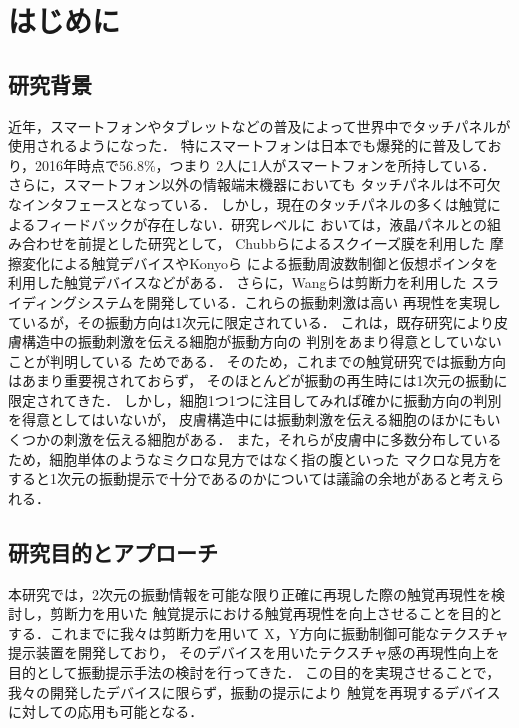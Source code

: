 
\chapter{はじめに}
\section{研究背景}
近年，スマートフォンやタブレットなどの普及によって世界中でタッチパネルが使用されるようになった．
特にスマートフォンは日本でも爆発的に普及しており，2016年時点で56.8\%，つまり
2人に1人がスマートフォンを所持している\cite{soumu}．
さらに，スマートフォン以外の情報端末機器においても
タッチパネルは不可欠なインタフェースとなっている．
しかし，現在のタッチパネルの多くは触覚によるフィードバックが存在しない．研究レベルに
おいては，液晶パネルとの組み合わせを前提とした研究として，
Chubbら\cite{chubb2010shiverpad}によるスクイーズ膜を利用した
摩擦変化による触覚デバイスやKonyoら\cite{konyo2008alternative}
による振動周波数制御と仮想ポインタを利用した触覚デバイスなどがある．
さらに，Wangら\cite{wang2004haptic}は剪断力を利用した
スライディングシステムを開発している．これらの振動刺激は高い
再現性を実現しているが，その振動方向は1次元に限定されている．
これは，既存研究により皮膚構造中の振動刺激を伝える細胞が振動方向の
判別をあまり得意としていないことが判明している
\cite{brisben1999detection}ためである．
そのため，これまでの触覚研究では振動方向はあまり重要視されておらず，
そのほとんどが振動の再生時には1次元の振動に限定されてきた．
しかし，細胞1つ1つに注目してみれば確かに振動方向の判別を得意としてはいないが，
皮膚構造中には振動刺激を伝える細胞のほかにもいくつかの刺激を伝える細胞がある．
また，それらが皮膚中に多数分布しているため，細胞単体のようなミクロな見方ではなく指の腹といった
マクロな見方をすると1次元の振動提示で十分であるのかについては議論の余地があると考えられる．

\section{研究目的とアプローチ}
本研究では，2次元の振動情報を可能な限り正確に再現した際の触覚再現性を検討し，剪断力を用いた
触覚提示における触覚再現性を向上させることを目的とする．これまでに我々は剪断力を用いて
X，Y方向に振動制御可能なテクスチャ提示装置を開発しており，
そのデバイスを用いたテクスチャ感の再現性向上を目的として振動提示手法の検討を行ってきた．
この目的を実現させることで，我々の開発したデバイスに限らず，振動の提示により
触覚を再現するデバイスに対しての応用も可能となる．

